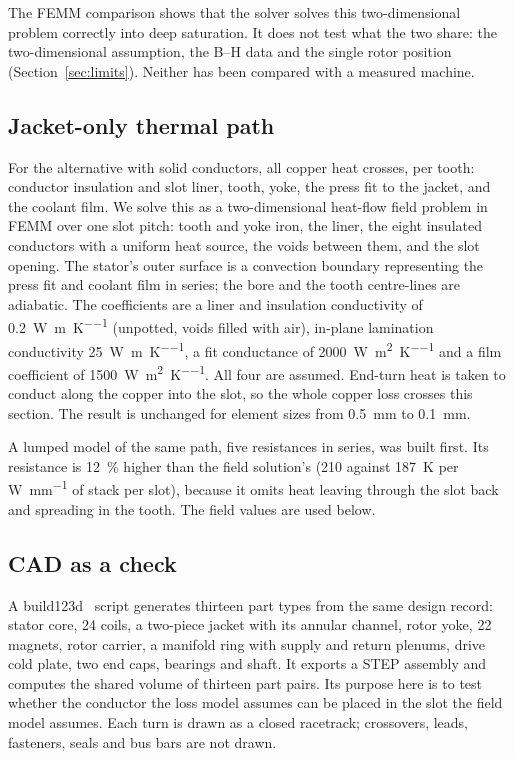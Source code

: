 \documentclass[11pt]{article}
\begin{document}
The FEMM comparison shows that the solver solves this two-dimensional problem
correctly into deep saturation. It does not test what the two share: the
two-dimensional assumption, the B--H data and the single rotor position
(Section~\ref{sec:limits}). Neither has been compared with a measured machine.

\subsection{Jacket-only thermal path}
\label{sec:jacketmodel}

For the alternative with solid conductors, all copper heat crosses, per tooth:
conductor insulation and slot liner, tooth, yoke, the press fit to the jacket,
and the coolant film. We solve this as a two-dimensional heat-flow field
problem in FEMM over one slot pitch: tooth and yoke iron, the liner, the eight
insulated conductors with a uniform heat source, the voids between them, and
the slot opening. The stator's outer surface is a convection boundary
representing the press fit and coolant film in series; the bore and the tooth
centre-lines are adiabatic. The coefficients are a liner and insulation
conductivity of \SI{0.2}{W\per\metre\per\kelvin} (unpotted, voids filled with
air), in-plane lamination conductivity \SI{25}{W\per\metre\per\kelvin}, a fit
conductance of \SI{2000}{W\per\metre\squared\per\kelvin} and a film
coefficient of \SI{1500}{W\per\metre\squared\per\kelvin}. All four are
assumed. End-turn heat is taken to conduct along the copper into the slot, so
the whole copper loss crosses this section. The result is unchanged for
element sizes from \SI{0.5}{mm} to \SI{0.1}{mm}.

A lumped model of the same path, five resistances in series, was built first.
Its resistance is \SI{12}{\percent} higher than the field solution's
(210 against \SI{187}{K} per \si{W\per\milli\metre} of stack per slot),
because it omits heat leaving through the slot back and spreading in the
tooth. The field values are used below.

\subsection{CAD as a check}
\label{sec:cad}

A build123d~\cite{build123d} script generates thirteen part types from the
same design record: stator core, 24 coils, a two-piece jacket with its annular
channel, rotor yoke, 22 magnets, rotor carrier, a manifold ring with supply
and return plenums, drive cold plate, two end caps, bearings and shaft. It
exports a STEP assembly and computes the shared volume of thirteen part pairs.
Its purpose here is to test whether the conductor the loss model assumes can
be placed in the slot the field model assumes. Each turn is drawn as a closed
racetrack; crossovers, leads, fasteners, seals and bus bars are not drawn.
\end{document}
